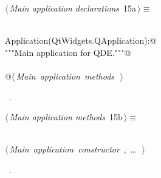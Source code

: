 \documentclass[
    a4paper,      %
    10pt,         %
    openright,    %
    notitlepage,  %
    parskip=half, %
]{scrreprt}       %
\theoremstyle{definition}                    %
\begin{document}
\begin{flushleft} \small
\begin{minipage}{\linewidth}\label{scrap2}\raggedright\small
{} $\langle\,${\itshape Main application declarations}\nobreak\ {\footnotesize {15a}}$\,\rangle\equiv$
\vspace{-1ex}
\begin{list}{}{} \item
\mbox{}\lstinline@@\\
\mbox{}\lstinline@class Application(QtWidgets.QApplication):@\\
\mbox{}\lstinline@    """Main application for QDE."""@\\
\mbox{}\lstinline@@\\
\mbox{}\lstinline@    @\hbox{$\langle\,${\itshape Main application methods}\nobreak\ {\footnotesize {}}$\,\rangle$}\lstinline@@\\
\mbox{}\lstinline@@{\NWsep}
\end{list}
\vspace{-1.5ex}
\footnotesize
\begin{list}{}{\setlength{\itemsep}{-\parsep}\setlength{\itemindent}{-\leftmargin}}
\item \NWtxtMacroRefIn\ .

\item{}
\end{list}
\end{minipage}\vspace{4ex}
\end{flushleft}
\begin{flushleft} \small
\begin{minipage}{\linewidth}\label{scrap3}\raggedright\small
{} $\langle\,${\itshape Main application methods}\nobreak\ {\footnotesize {15b}}$\,\rangle\equiv$
\vspace{-1ex}
\begin{list}{}{} \item
\mbox{}\lstinline@@\\
\mbox{}\lstinline@@\hbox{$\langle\,${\itshape Main application constructor}\nobreak\ {\footnotesize {}, \ldots\ }$\,\rangle$}\lstinline@@\\
\mbox{}\lstinline@@{\NWsep}
\end{list}
\vspace{-1.5ex}
\footnotesize
\begin{list}{}{\setlength{\itemsep}{-\parsep}\setlength{\itemindent}{-\leftmargin}}
\item \NWtxtMacroRefIn\ .

\item{}
\end{list}
\end{minipage}\vspace{4ex}
\end{flushleft}
\end{document}
